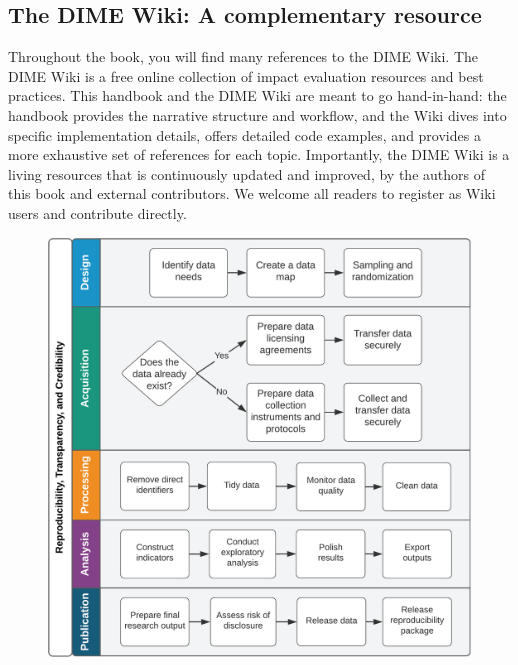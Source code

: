 \subsection*{The DIME Wiki: A complementary resource}
Throughout the book, you will find many references to the DIME Wiki.
The DIME Wiki is a free online collection of impact evaluation resources and best practices. 
This handbook and the DIME Wiki are meant to go hand-in-hand: 
the handbook provides the narrative structure and workflow, 
and the Wiki dives into specific implementation details,
offers detailed code examples, and 
provides a more exhaustive set of references for each topic. 
Importantly, the DIME Wiki is a living resources that is 
continuously updated and improved,
by the authors of this book and external contributors.
We welcome all readers to register as Wiki users and contribute directly. 


\begin{fullwidth}
	\begin{figure}
		\centering
		\includegraphics[width=1.5\linewidth]{diagrams/Introduction}
		\label{fig:intro}
	\end{figure}
\end{fullwidth}

